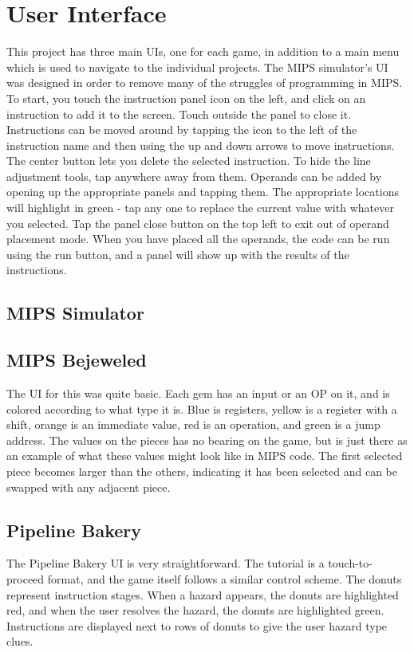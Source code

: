 \documentclass[12pt]{article}
\begin{document}
	\section{User Interface}
	This project has three main UIs, one for each game, in addition to a main menu which is used to navigate to the individual projects. The MIPS simulator's UI was designed in order to remove many of the struggles of programming in MIPS. To start, you touch the instruction panel icon on the left, and click on an instruction to add it to the screen. Touch outside the panel to close it. Instructions can be moved around by tapping the icon to the left of the instruction name and then using the up and down arrows to move instructions. The center button lets you delete the selected instruction. To hide the line adjustment tools, tap anywhere away from them. Operands can be added by opening up the appropriate panels and tapping them. The appropriate locations will highlight in green - tap any one to replace the current value with whatever you selected. Tap the panel close button on the top left to exit out of operand placement mode. When you have placed all the operands, the code can be run using the run button, and a panel will show up with the results of the instructions.
	\subsection{MIPS Simulator}
	\subsection{MIPS Bejeweled}
	The UI for this was quite basic. Each gem has an input or an OP on it, and is colored according to what type it is. Blue is registers, yellow is a register with a shift, orange is an immediate value, red is an operation, and green is a jump address. The values on the pieces has no bearing on the game, but is just there as an example of what these values might look like in MIPS code. The first selected piece becomes larger than the others, indicating it has been selected and can be swapped with any adjacent piece.
	\subsection{Pipeline Bakery}
	The Pipeline Bakery UI is very straightforward. The tutorial is a touch-to-proceed format, and the game itself follows a similar control scheme. The donuts represent instruction stages. When a hazard appears, the donuts are highlighted red, and when the user resolves the hazard, the donuts are highlighted green. Instructions are displayed next to rows of donuts to give the user hazard type clues.
\end{document}
